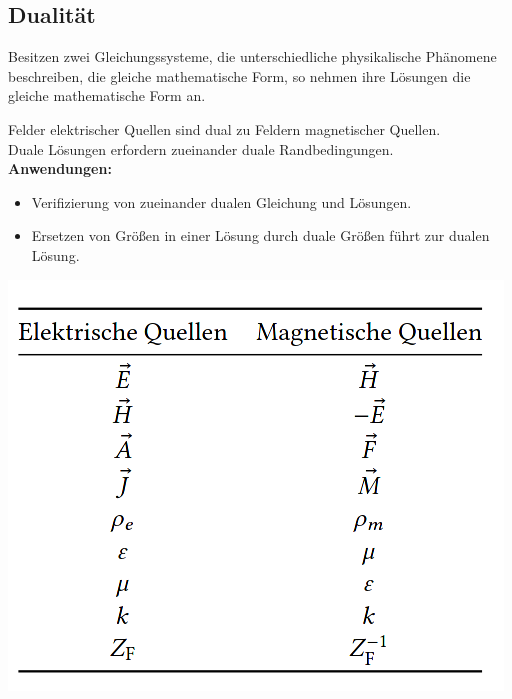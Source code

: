 \documentclass[english]{latex4ei/latex4ei_sheet}
\begin{document}
\begin{sectionbox}
    \subsection{Dualität}
    Besitzen zwei Gleichungssysteme, die unterschiedliche physikalische Phänomene beschreiben, die gleiche mathematische Form, so nehmen ihre Lösungen die gleiche mathematische Form an.

    Felder elektrischer Quellen sind dual zu Feldern magnetischer Quellen.\\
    Duale Lösungen erfordern zueinander duale Randbedingungen.\\
    \textbf{Anwendungen:}
    \begin{itemize}
        \item Verifizierung von zueinander dualen Gleichung und Lösungen.
        \item Ersetzen von Größen in einer Lösung durch duale Größen führt zur dualen Lösung.
    \end{itemize}
    \includegraphics[width=\textwidth]{./img/dualitaet_tabelle.png}
\end{sectionbox}
\end{document}
